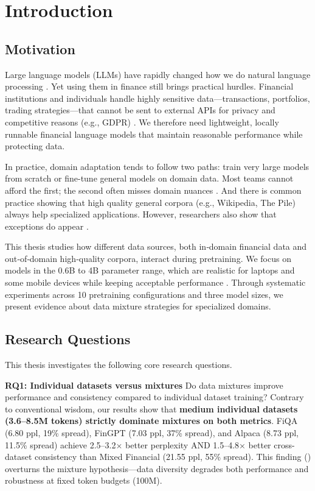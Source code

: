 \chapter{Introduction}

\section{Motivation}

Large language models (LLMs) have rapidly changed how we do natural language processing \parencite{vaswani2017attention,radford2019language,brown2020language,touvron2023llama}. Yet using them in finance still brings practical hurdles. Financial institutions and individuals handle highly sensitive data—transactions, portfolios, trading strategies—that cannot be sent to external APIs for privacy and competitive reasons (e.g., GDPR) \parencite{eu2016gdpr}. We therefore need lightweight, locally runnable financial language models that maintain reasonable performance while protecting data.

In practice, domain adaptation tends to follow two paths: train very large models from scratch or fine-tune general models on domain data. Most teams cannot afford the first; the second often misses domain nuances \parencite{gururangan2020don}. And there is common practice showing that high quality general corpora (e.g., Wikipedia, The Pile) always help specialized applications. However, researchers also show that exceptions do appear \parencite{gao2020pile,raffel2020exploring,longpre2023pretrainer}.

This thesis studies how different data sources, both in‑domain financial data and out‑of‑domain high‑quality corpora, interact during pretraining. We focus on models in the 0.6B to 4B parameter range, which are realistic for laptops and some mobile devices while keeping acceptable performance \parencite{yang2024qwen2,xia2023sheared,team2024gemma,javaheripi2023phi}. Through systematic experiments across 10 pretraining configurations and three model sizes, we present evidence about data mixture strategies for specialized domains.

\section{Research Questions}

This thesis investigates the following core research questions.

\textbf{RQ1: Individual datasets versus mixtures}
Do data mixtures improve performance and consistency compared to individual dataset training? Contrary to conventional wisdom, our results show that \textbf{medium individual datasets (3.6–8.5M tokens) strictly dominate mixtures on both metrics}. FiQA (6.80 ppl, 19\% spread), FinGPT (7.03 ppl, 37\% spread), and Alpaca (8.73 ppl, 11.5\% spread) achieve 2.5–3.2$\times$ better perplexity AND 1.5–4.8$\times$ better cross-dataset consistency than Mixed Financial (21.55 ppl, 55\% spread). This finding () overturns the mixture hypothesis—data diversity degrades both performance and robustness at fixed token budgets (100M).

